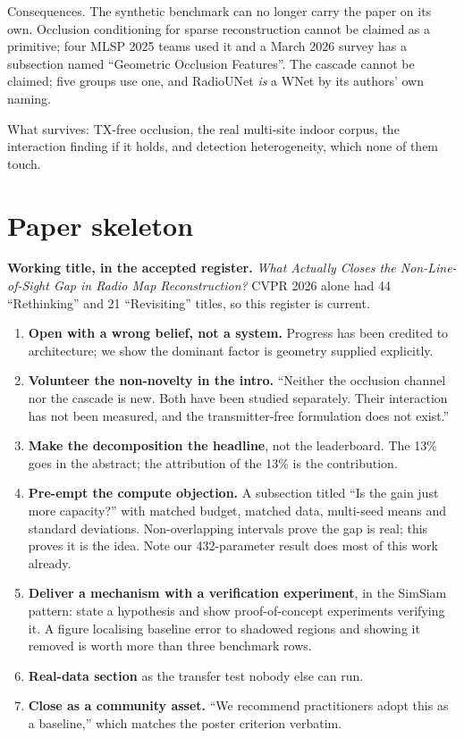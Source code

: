 \documentclass[10pt,a4paper]{article}
\begin{document}
Consequences. The synthetic benchmark can no longer carry the paper on its own. Occlusion
conditioning for sparse reconstruction cannot be claimed as a primitive; four MLSP 2025
teams used it and a March 2026 survey has a subsection named ``Geometric Occlusion
Features''. The cascade cannot be claimed; five groups use one, and RadioUNet
\emph{is} a WNet by its authors' own naming.

What survives: TX-free occlusion, the real multi-site indoor corpus, the interaction
finding if it holds, and detection heterogeneity, which none of them touch.

\section{Paper skeleton}

\textbf{Working title, in the accepted register.} \emph{What Actually Closes the
Non-Line-of-Sight Gap in Radio Map Reconstruction?} CVPR 2026 alone had 44 ``Rethinking''
and 21 ``Revisiting'' titles, so this register is current.

\begin{enumerate}
\item \textbf{Open with a wrong belief, not a system.} Progress has been credited to
architecture; we show the dominant factor is geometry supplied explicitly.
\item \textbf{Volunteer the non-novelty in the intro.} ``Neither the occlusion channel nor
the cascade is new. Both have been studied separately. Their interaction has not been
measured, and the transmitter-free formulation does not exist.''
\item \textbf{Make the decomposition the headline}, not the leaderboard. The 13\% goes in
the abstract; the attribution of the 13\% is the contribution.
\item \textbf{Pre-empt the compute objection.} A subsection titled ``Is the gain just more
capacity?'' with matched budget, matched data, multi-seed means and standard deviations.
Non-overlapping intervals prove the gap is real; this proves it is the idea. Note our
432-parameter result does most of this work already.
\item \textbf{Deliver a mechanism with a verification experiment}, in the SimSiam pattern:
state a hypothesis and show proof-of-concept experiments verifying it. A figure localising
baseline error to shadowed regions and showing it removed is worth more than three
benchmark rows.
\item \textbf{Real-data section} as the transfer test nobody else can run.
\item \textbf{Close as a community asset.} ``We recommend practitioners adopt this as a
baseline,'' which matches the poster criterion verbatim.
\end{enumerate}
\end{document}
